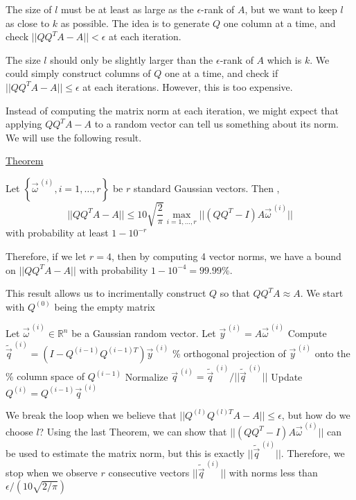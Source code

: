 The size of $l$ must be at least as large as the $\epsilon$-rank of $A$, but we want to keep $l$ as close to $k$ as possible. The idea is to generate $Q$ one column at a time, and check $||QQ^TA-A||<\epsilon$ at each iteration. 



The size $l$ should only be slightly larger than the $\epsilon$-rank of $A$ which is $k$. We could simply construct columns of $Q$ one at a time, and check if $|| QQ^TA-A|| \leq \epsilon$ at each iterations. However, this is too expensive.

Instead of computing the matrix norm at each iteration, we might expect that applying $QQ^TA-A$ to a random vector can tell us something about its norm. We will use the following result.

\underline{Theorem}

Let $\left\{ \vec{\omega}^{\,(i)}, i=1, \ldots, r\right\}$ be $r$ standard Gaussian vectors. Then ,
\begin{equation*}
    || QQ^TA-A|| \leq 10 \sqrt{\frac{2}{\pi}}\max_{i=1, \ldots, r} ||(QQ^T - I)A\vec{\omega}^{\,(i)}||
\end{equation*}
with probability at least $1-10^{-r}$

Therefore, if we let $r=4$, then by computing 4 vector norms, we have a bound on $||QQ^TA-A||$ with probability $1-10^{-4} = 99.99\%$.

This result allows us to incrimentally construct $Q$ so that $QQ^TA\approx A$. We start with $Q^{(0)}$ being the empty matrix


\begin{algorithm}
    \begin{algorithmic}
      \STATE Let $\vec{\omega}^{\,(i)} \in \mathbb{R}^n$ be a Gaussian random vector.
      \STATE Let $\vec{y}^{\,(i)} = A\vec{\omega}^{\,(i)}$ 
      \STATE Compute $\widetilde{\vec{q}}^{\,(i)} = \left( I - Q^{(i-1)}Q^{(i-1)T} \right)\vec{y}^{\,(i)}$
      {\color{red}
      \STATE \quad \% orthogonal projection of $\vec{y}^{\,(i)}$ onto the
      \STATE \quad \% column space of $Q^{(i-1)}$
      }
      \STATE Normalize $\vec{q}^{\,(i)} = \widetilde{\vec{q}}^{\,(i)} / ||\widetilde{\vec{q}}^{\,(i)}||$
      \STATE Update $Q^{(i)} = Q^{(i-1)} \vec{q}^{\,(i)}$
    \ENDFOR
      \end{algorithmic}
  \end{algorithm}
We break the loop when we believe that $||Q^{(l)}Q^{(l)T}A-A|| \leq \epsilon$, but how do we choose $l$? Using the last Theorem, we can show that $||(QQ^T - I)A\vec{\omega}^{\,(i)}||$ can be used to estimate the matrix norm, but this is exactly $||\widetilde{\vec{q}}^{\,(i)}||$. Therefore, we stop when we observe $r$ consecutive vectors $||\widetilde{\vec{q}}^{\,(i)}||$ with norms less than $\epsilon/(10\sqrt{2/\pi})$


